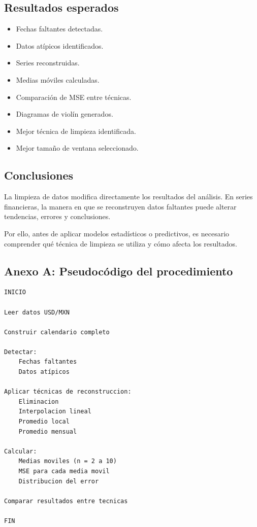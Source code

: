 \subsection{Resultados esperados}

\begin{itemize}
\item Fechas faltantes detectadas.
\item Datos atípicos identificados.
\item Series reconstruidas.
\item Medias móviles calculadas.
\item Comparación de MSE entre técnicas.
\item Diagramas de violín generados.
\item Mejor técnica de limpieza identificada.
\item Mejor tamaño de ventana seleccionado.
\end{itemize}

\subsection{Conclusiones}

La limpieza de datos modifica directamente los resultados del análisis. En series financieras, la manera en que se reconstruyen datos faltantes puede alterar tendencias, errores y conclusiones.

Por ello, antes de aplicar modelos estadísticos o predictivos, es necesario comprender qué técnica de limpieza se utiliza y cómo afecta los resultados.


\subsection{Anexo A: Pseudocódigo del procedimiento}

\begin{verbatim}
INICIO

Leer datos USD/MXN

Construir calendario completo

Detectar:
    Fechas faltantes
    Datos atípicos

Aplicar técnicas de reconstruccion:
    Eliminacion
    Interpolacion lineal
    Promedio local
    Promedio mensual

Calcular:
    Medias moviles (n = 2 a 10)
    MSE para cada media movil
    Distribucion del error

Comparar resultados entre tecnicas

FIN
\end{verbatim}


